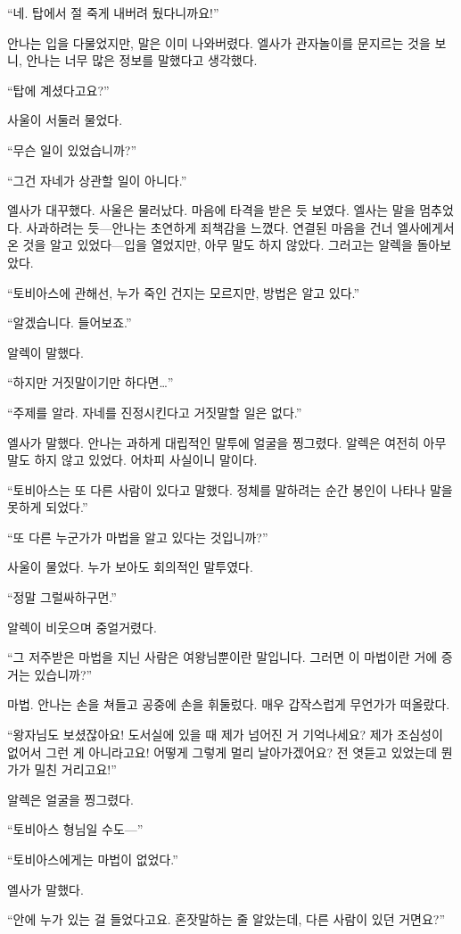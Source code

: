 ``네. 탑에서 절 죽게 내버려 뒀다니까요!''

안나는 입을 다물었지만, 말은 이미 나와버렸다. 엘사가 관자놀이를 문지르는 것을 보니, 안나는 너무 많은 정보를 말했다고 생각했다.

``탑에 계셨다고요?''

사울이 서둘러 물었다.

``무슨 일이 있었습니까?''

``그건 자네가 상관할 일이 아니다.''

엘사가 대꾸했다. 사울은 물러났다. 마음에 타격을 받은 듯 보였다. 엘사는 말을 멈추었다. 사과하려는 듯—안나는 초연하게 죄책감을 느꼈다. 연결된 마음을 건너 엘사에게서 온 것을 알고 있었다—입을 열었지만, 아무 말도 하지 않았다. 그러고는 알렉을 돌아보았다.

``토비아스에 관해선, 누가 죽인 건지는 모르지만, 방법은 알고 있다.''

``알겠습니다. 들어보죠.''

알렉이 말했다.

``하지만 거짓말이기만 하다면\ldots''

``주제를 알라. 자네를 진정시킨다고 거짓말할 일은 없다.''

엘사가 말했다. 안나는 과하게 대립적인 말투에 얼굴을 찡그렸다. 알렉은 여전히 아무 말도 하지 않고 있었다. 어차피 사실이니 말이다.

``토비아스는 또 다른 사람이 있다고 말했다. 정체를 말하려는 순간 봉인이 나타나 말을 못하게 되었다.''

``또 다른 누군가가 마법을 알고 있다는 것입니까?''

사울이 물었다. 누가 보아도 회의적인 말투였다.

``정말 그럴싸하구먼.''

알렉이 비웃으며 중얼거렸다.

``그 저주받은 마법을 지닌 사람은 여왕님뿐이란 말입니다. 그러면 이 마법이란 거에 증거는 있습니까?''

마법. 안나는 손을 쳐들고 공중에 손을 휘둘렀다. 매우 갑작스럽게 무언가가 떠올랐다.

``왕자님도 보셨잖아요! 도서실에 있을 때 제가 넘어진 거 기억나세요? 제가 조심성이 없어서 그런 게 아니라고요! 어떻게 그렇게 멀리 날아가겠어요? 전 엿듣고 있었는데 뭔가가 밀친 거리고요!''

알렉은 얼굴을 찡그렸다.

``토비아스 형님일 수도—''

``토비아스에게는 마법이 없었다.''

엘사가 말했다.

``안에 누가 있는 걸 들었다고요. 혼잣말하는 줄 알았는데, 다른 사람이 있던 거면요?''

